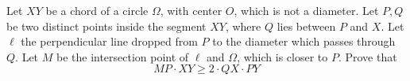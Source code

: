 Let $XY$ be a chord of a circle $\Omega$,  with center $O$,  which is not a diameter. Let $P, Q$ be two distinct points inside the segment $XY$,  where $Q$ lies between $P$ and $X$. Let $\ell$ the perpendicular line dropped from $P$ to the diameter which passes through $Q$. Let $M$ be the intersection point of $\ell$ and  $\Omega$,  which is closer to $P$. Prove that $$ MP \cdot XY \ge 2 \cdot QX \cdot PY$$
